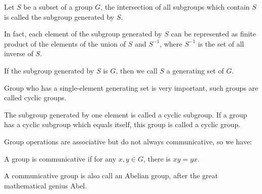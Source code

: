 \begin{defi}
Let $S$ be a subset of a group $G$, the intersection of all subgroups which contain $S$ is called the subgroup generated by $S$.
\end{defi}
In fact, each element of the subgroup generated by $S$ can be represented as finite product of the elements of the union of $S$ and $S^{-1}$, where $S^{-1}$ is the set of all inverse of $S$.
\begin{defi}
If the subgroup generated by $S$ is $G$, then we call $S$ a generating set of $G$.
\end{defi}
Group who has a single-element generating set is very important, such groups are called cyclic groups.
\begin{defi}
The subgroup generated by one element is called a cyclic subgroup.
If a group has a cyclic subgroup which equals itself, this group is called a cyclic group.
\end{defi}
Group operations are associative but do not always communicative, so we have:
\begin{defi}
A group is communicative if for any $x, y \in G$, there is $xy = yx$.
\end{defi}
A communicative group is also call an Abelian group, after the great mathematical genius Abel.


